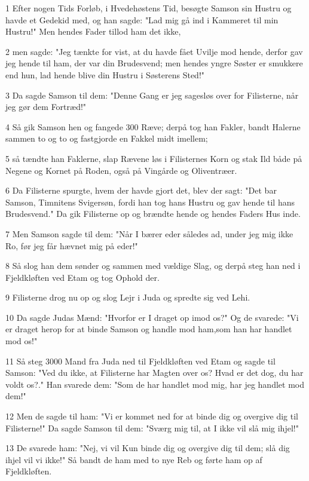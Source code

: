 \par 1 Efter nogen Tids Forløb, i Hvedehøstens Tid, besøgte Samson sin Hustru og havde et Gedekid med, og han sagde: "Lad mig gå ind i Kammeret til min Hustru!" Men hendes Fader tillod ham det ikke,
\par 2 men sagde: "Jeg tænkte for vist, at du havde fået Uvilje mod hende, derfor gav jeg hende til ham, der var din Brudesvend; men hendes yngre Søster er smukkere end hun, lad hende blive din Hustru i Søsterens Sted!"
\par 3 Da sagde Samson til dem: "Denne Gang er jeg sagesløs over for Filisterne, når jeg gør dem Fortræd!"
\par 4 Så gik Samson hen og fangede 300 Ræve; derpå tog han Fakler, bandt Halerne sammen to og to og fastgjorde en Fakkel midt imellem;
\par 5 så tændte han Faklerne, slap Rævene løs i Filisternes Korn og stak Ild både på Negene og Kornet på Roden, også på Vingårde og Oliventræer.
\par 6 Da Filisterne spurgte, hvem der havde gjort det, blev der sagt: "Det bar Samson, Timnitens Svigersøn, fordi han tog hans Hustru og gav hende til hans Brudesvend." Da gik Filisterne op og brændte hende og hendes Faders Hus inde.
\par 7 Men Samson sagde til dem: "Når I bærer eder således ad, under jeg mig ikke Ro, før jeg får hævnet mig på eder!"
\par 8 Så slog han dem sønder og sammen med vældige Slag, og derpå steg han ned i Fjeldkløften ved Etam og tog Ophold der.
\par 9 Filisterne drog nu op og slog Lejr i Juda og spredte sig ved Lehi.
\par 10 Da sagde Judas Mænd: "Hvorfor er I draget op imod os?" Og de svarede: "Vi er draget herop for at binde Samson og handle mod ham,som han har handlet mod os!"
\par 11 Så steg 3000 Mand fra Juda ned til Fjeldkløften ved Etam og sagde til Samson: "Ved du ikke, at Filisterne har Magten over os? Hvad er det dog, du har voldt os?." Han svarede dem: "Som de har handlet mod mig, har jeg handlet mod dem!"
\par 12 Men de sagde til ham: "Vi er kommet ned for at binde dig og overgive dig til Filisterne!" Da sagde Samson til dem: "Sværg mig til, at I ikke vil slå mig ihjel!"
\par 13 De svarede ham: "Nej, vi vil Kun binde dig og overgive dig til dem; slå dig ihjel vil vi ikke!" Så bandt de ham med to nye Reb og førte ham op af Fjeldkløften.
